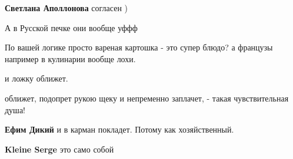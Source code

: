 \begin{itemize}
\begin{itemize}
\textbf{Светлана Аполлонова} согласен )

 
А в Русской печке они вообще уффф

 
По вашей логике просто вареная картошка - это супер блюдо? а французы например в кулинарии вообще лохи.
\end{itemize}

 
и ложку оближет.

\begin{itemize}
 
оближет, подопрет рукою щеку и непременно заплачет, - такая чувствительная душа!

 
\textbf{Ефим Дикий} и в карман покладет. Потому как хозяйственный.

 
\textbf{Kleine Serge} это само собой

 

\end{itemize}
\end{itemize}
